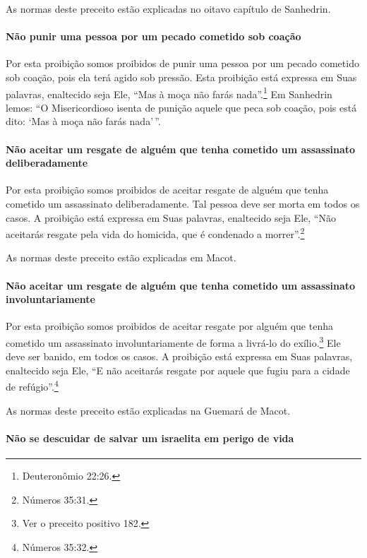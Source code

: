 As normas deste preceito estão explicadas no oitavo capítulo de Sanhedrin.

\paragraph{Não punir uma pessoa por um pecado cometido sob coação}

Por esta proibição somos proibidos de punir uma pessoa por um pecado
cometido sob coação, pois ela terá agido sob pressão. Esta proibição
está expressa em Suas palavras, enaltecido seja Ele, ``Mas à moça não
farás nada''.\footnote{Deuteronômio 22:26.} Em Sanhedrin lemos: ``O
Misericordioso isenta de punição aquele que peca sob coação, pois está
dito: `Mas à moça não farás nada'\,''.

\paragraph{Não aceitar um resgate de alguém que tenha cometido um assassinato deliberadamente}

Por esta proibição somos proibidos de aceitar resgate de alguém que
tenha cometido um assassinato deliberadamente. Tal pessoa deve ser morta
em todos os casos. A proibição está expressa em Suas palavras, enaltecido
seja Ele, ``Não aceitarás resgate pela vida do homicida, que é condenado
a morrer''.\footnote{Números 35:31.}

As normas deste preceito estão explicadas em Macot.

\paragraph{Não aceitar um resgate de alguém que tenha cometido um assassinato involuntariamente}

Por esta proibição somos proibidos de aceitar resgate por alguém que
tenha cometido um assassinato involuntariamente de forma a livrá-lo do
exílio.\footnote{Ver o preceito positivo 182.} Ele deve ser banido, em todos os casos. A
proibição está expressa em Suas palavras, enaltecido seja Ele, ``E não
aceitarás resgate por aquele que fugiu para a cidade de refúgio''.\footnote{Números 35:32.}

As normas deste preceito estão explicadas na Guemará de Macot.

\paragraph{Não se descuidar de salvar um israelita em perigo de vida}

